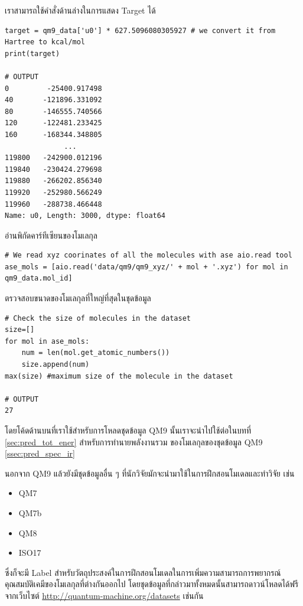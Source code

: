 \noindent เราสามารถใช้คำสั่งด้านล่างในการแสดง Target ได้

\begin{lstlisting}[style=MyPython]
target = qm9_data['u0'] * 627.5096080305927 # we convert it from Hartree to kcal/mol
print(target)

# OUTPUT
0         -25400.917498
40       -121896.331092
80       -146555.740566
120      -122481.233425
160      -168344.348805
              ...      
119800   -242900.012196
119840   -230424.279698
119880   -266202.856340
119920   -252980.566249
119960   -288738.466448
Name: u0, Length: 3000, dtype: float64
\end{lstlisting}

\noindent อ่านพิกัดคาร์ทีเซียนของโมเลกุล

\begin{lstlisting}[style=MyPython]
# We read xyz coorinates of all the molecules with ase aio.read tool
ase_mols = [aio.read('data/qm9/qm9_xyz/' + mol + '.xyz') for mol in qm9_data.mol_id]
\end{lstlisting}

\noindent ตรวจสอบขนาดของโมเลกุลที่ใหญ่ที่สุดในชุดข้อมูล

\begin{lstlisting}[style=MyPython]
# Check the size of molecules in the dataset
size=[]
for mol in ase_mols:
    num = len(mol.get_atomic_numbers())
    size.append(num)
max(size) #maximum size of the molecule in the dataset

# OUTPUT
27
\end{lstlisting}

โดยโค้ดด้านบนที่เราใช้สำหรับการโหลดชุดข้อมูล QM9 นั้นเราจะนำไปใช้ต่อในบทที่ \ref{sec:pred_tot_ener} สำหรับการทำนายพลังงานรวม%
ของโมเลกุลของชุดข้อมูล QM9 \ref{ssec:pred_spec_ir}

นอกจาก QM9 แล้วยังมีชุดข้อมูลอื่น ๆ ที่นักวิจัยมักจะนำมาใช้ในการฝึกสอนโมเดลและทำวิจัย เช่น 

\begin{itemize}
    \item QM7\autocite{blum2009,rupp2012a}
    \item QM7b\autocite{blum2009,montavon2013}
    \item QM8\autocite{ruddigkeit2012,ramakrishnan2015}
    \item ISO17\autocite{schutt2017,schutt2017a,ramakrishnan2014}
\end{itemize}

\noindent ซึ่งก็จะมี Label สำหรับวัตถุประสงค์ในการฝึกสอนโมเดลในการเพิ่มความสามารถการพยากรณ์คุณสมบัติเคมีของโมเลกุลที่ต่างกันออกไป 
โดยชุดข้อมูลที่กล่าวมาทั้งหมดนั้นสามารถดาวน์โหลดได้ฟรีจากเว็บไซต์ \url{http://quantum-machine.org/datasets} เช่นกัน

